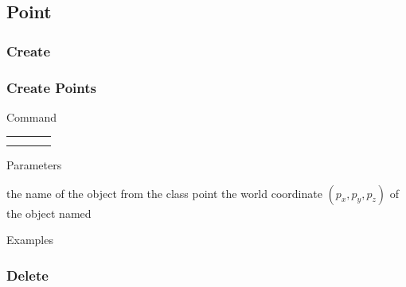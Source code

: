\documentclass[9pt]{beamer}
\begin{document}
\subsection{Point}

\subsubsection{Create}

\begin{frame}[t] \frametitle{Create Points}

	\begin{block}{Command} 
		\begin{tabularx}{\textwidth}{@{}l@{}l@{}l@{}R}
			 &
			  	 &
			  	 & \InstrItem \\
			 &
				 &
				 & \InstrItem
		\end{tabularx}
	\end{block}

	\begin{block}{Parameters} \begin{itemize}
		   the name of the object from the class point
		     the world coordinate $(p_x, p_y, p_z)$ of the object named 
	\end{itemize} \end{block}

	\begin{block}{Examples}
	\end{block}

\end{frame}

\subsubsection{Delete}
\end{document}
